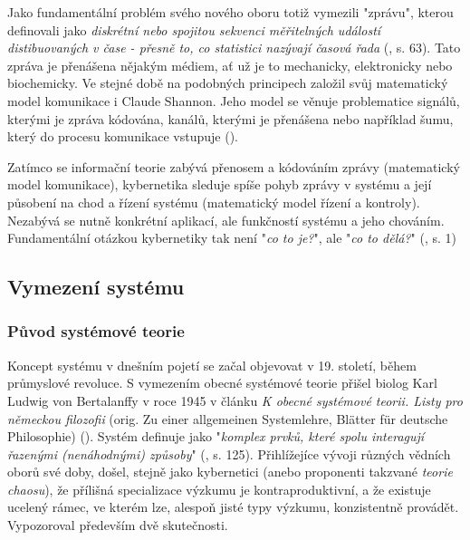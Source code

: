 \documentclass[11pt,a4paper]{article}
\begin{document}
Jako fundamentální problém svého nového oboru totiž vymezili "zprávu", kterou definovali jako \textit{diskrétní nebo spojitou sekvenci měřitelných událostí distibuovaných v čase - přesně to, co statistici nazývají časová řada} (\cite{wiener_cybernetics_2019}, s. 63). Tato zpráva je přenášena nějakým médiem, ať už je to mechanicky, elektronicky nebo biochemicky. Ve stejné době na podobných principech založil svůj matematický model komunikace i Claude Shannon. Jeho model se věnuje problematice signálů, kterými je zpráva kódována, kanálů, kterými je přenášena nebo například šumu, který do procesu komunikace vstupuje (\cite{shannon_mathematical_1998}).

Zatímco se informační teorie zabývá přenosem a kódováním zprávy (matematický model komunikace), kybernetika sleduje spíše pohyb zprávy v systému a její působení na chod a řízení systému (matematický model řízení a kontroly). Nezabývá se nutně konkrétní aplikací, ale funkčností systému a jeho chováním. Fundamentální otázkou kybernetiky tak není "\textit{co to je?}", ale "\textit{co to dělá?}" (\cite{ashby_introduction_2015}, s. 1) 


\subsection{Vymezení systému}

\subsubsection{Původ systémové teorie}

Koncept systému v dnešním pojetí se začal objevovat v 19. století, během průmyslové revoluce. S vymezením obecné systémové teorie přišel biolog Karl Ludwig von Bertalanffy v roce 1945 v článku \textit{K obecné systémové teorii. Listy pro německou filozofii} (orig. Zu einer allgemeinen Systemlehre, Blätter für deutsche Philosophie) (\cite*{bleicher_zu_1972}). Systém definuje jako "\textit{komplex prvků, které spolu interagují řazenými (nenáhodnými) způsoby}" (\cite{von_bertalanffy_general_1967}, s. 125). Přihlížejíce vývoji různých vědních oborů své doby, došel, stejně jako kybernetici (anebo proponenti takzvané \textit{teorie chaosu}), že přílišná specializace výzkumu je kontraproduktivní, a že existuje ucelený rámec, ve kterém lze, alespoň jisté typy výzkumu, konzistentně provádět. Vypozoroval především dvě skutečnosti. 
\end{document}
